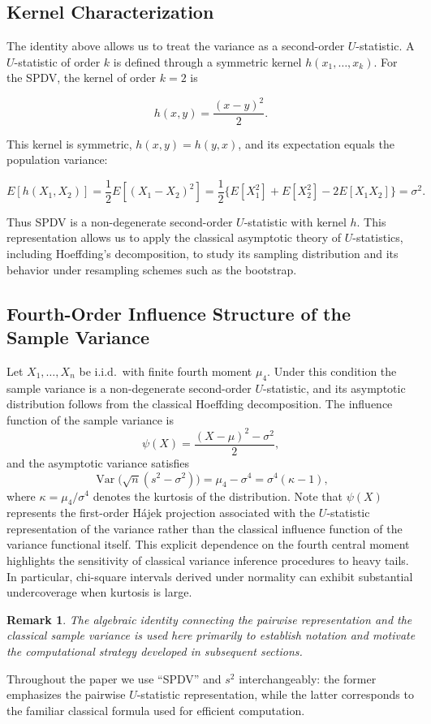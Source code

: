 \documentclass[12pt,a4paper]{article}
\newtheorem{remark}{Remark}
\begin{document}
\subsection{Kernel Characterization}

The identity above allows us to treat the variance as a second-order $U$-statistic. 
A $U$-statistic of order $k$ is defined through a symmetric kernel $h(x_1,\dots,x_k)$. 
For the SPDV, the kernel of order $k=2$ is

\[
h(x,y) = \frac{(x-y)^2}{2}.
\]

This kernel is symmetric, $h(x,y)=h(y,x)$, and its expectation equals the population variance:

\[
E[h(X_1,X_2)]
=
\frac{1}{2}E[(X_1-X_2)^2]
=
\frac{1}{2}\{E[X_1^2]+E[X_2^2]-2E[X_1X_2]\}
=
\sigma^2.
\]

Thus SPDV is a non-degenerate second-order $U$-statistic with kernel $h$. 
This representation allows us to apply the classical asymptotic theory of $U$-statistics, 
including Hoeffding’s decomposition, to study its sampling distribution and its behavior 
under resampling schemes such as the bootstrap.

\subsection{Fourth-Order Influence Structure of the Sample Variance}

Let $X_1,\dots,X_n$ be i.i.d.\ with finite fourth moment $\mu_4$. 
Under this condition the sample variance is a non-degenerate second-order $U$-statistic, 
and its asymptotic distribution follows from the classical Hoeffding decomposition. 
The influence function of the sample variance is
\[
\psi(X) = \frac{(X-\mu)^2 - \sigma^2}{2},
\]
and the asymptotic variance satisfies
\[
\operatorname{Var}\bigl(\sqrt{n}(s^2 - \sigma^2)\bigr) 
= \mu_4 - \sigma^4 
= \sigma^4(\kappa - 1),
\]
where $\kappa = \mu_4/\sigma^4$ denotes the kurtosis of the distribution. 
Note that $\psi(X)$ represents the first-order Hájek projection associated with the $U$-statistic representation of the variance rather than the
classical influence function of the variance functional itself. This explicit dependence on the fourth central moment highlights the sensitivity of classical 
variance inference procedures to heavy tails. In particular, chi-square intervals derived under 
normality can exhibit substantial undercoverage when kurtosis is large. 

\begin{remark}
The algebraic identity connecting the pairwise representation and the classical sample variance is used here primarily to establish notation and motivate the computational strategy developed in subsequent sections.
\end{remark}
Throughout the paper we use “SPDV” and $s^2$ interchangeably: the former emphasizes the pairwise 
$U$-statistic representation, while the latter corresponds to the familiar classical formula used 
for efficient computation.
\end{document}
